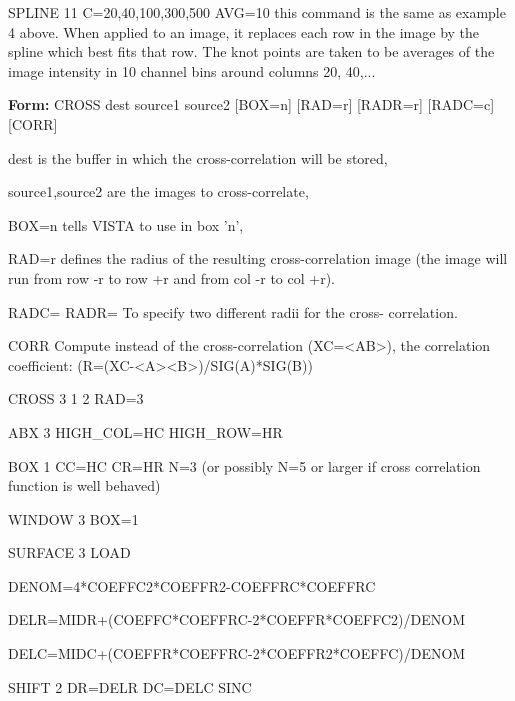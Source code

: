 {\newpage\clearpage
{}%
\begin{example}
  \item[SPLINE 11 C=20,40,100,300,500 AVG=10\hfill]{ this command is the
       same as example 4 above.  When applied to an image, it replaces each
       row in the image by the spline which best fits that row. The knot
       points are taken to be averages of the image intensity in 10 channel
       bins around columns 20, 40,...}
\end{example}%
\lthtmlfigureZ
\lthtmlcheckvsize\clearpage}

{\newpage\clearpage
{}%
\begin{command}
  \item[\textbf{Form: }CROSS dest source1 source2 {[BOX=n]} {[RAD=r]} {[RADR=r]} {[RADC=c]} {[CORR]}\hfill]{}
  \item[dest]{is the buffer in which the cross-correlation will be stored,}
  \item[source1,source2]{are the images to cross-correlate,}
  \item[BOX=n]{tells VISTA to use in box 'n',}
  \item[RAD=r]{defines the radius of the resulting cross-correlation image 
       (the image will run from row -r to row +r and from col -r to col +r).}
  \item[RADC= RADR=]{To specify two different radii for the cross-
       correlation.}
  \item[CORR]{Compute instead of the cross-correlation (XC=<AB>), 
              the correlation coefficient: (R=(XC-<A><B>)/SIG(A)*SIG(B))}
\end{command}%
\lthtmlfigureZ
\lthtmlcheckvsize\clearpage}

{\newpage\clearpage
{}%
\begin{hanging}
  \item{CROSS 3 1 2 RAD=3}
  \item{ABX 3 HIGH\_COL=HC HIGH\_ROW=HR}
  \item{BOX 1 CC=HC CR=HR N=3  (or possibly N=5 or larger if cross correlation
             function is well behaved)}
  \item{WINDOW 3 BOX=1}
  \item{SURFACE 3 LOAD}
  \item{DENOM=4*COEFFC2*COEFFR2-COEFFRC*COEFFRC}
  \item{DELR=MIDR+(COEFFC*COEFFRC-2*COEFFR*COEFFC2)/DENOM}
  \item{DELC=MIDC+(COEFFR*COEFFRC-2*COEFFR2*COEFFC)/DENOM}
  \item{SHIFT 2 DR=DELR DC=DELC SINC}
\end{hanging}%
\lthtmlfigureZ
\lthtmlcheckvsize\clearpage}

